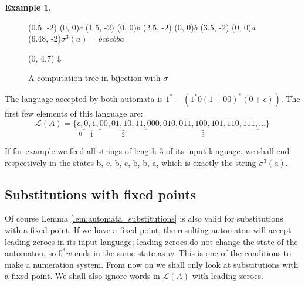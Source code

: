 \documentclass{article}
\theoremstyle{definition}
\newtheorem{example}[theorem]{Example}
\begin{document}
\begin{example}
\begin{figure}[H]
\begin{graph}
  (0.5, -2)  (0, 0){$c$}
  (1.5, -2)  (0, 0){$b$}
  (2.5, -2)  (0, 0){$b$}
  (3.5, -2)  (0, 0){$a$}
  \freetext(6.48, -2){$\sigma^3(a) = bcbcbba$}

   
   

   
   
   
   

   
   
   
   
   
   
   

  \freetext(0, 4.7){$\Downarrow$}
\end{graph}
\caption{A computation tree in bijection with $\sigma$}
\label{fig:automata_tree_substitutions}
\end{figure}
The language accepted by both automata is 
$1^* + (1^* 0 (1 + 00)^* (0 + \epsilon))$. The first few elements of this
language are:
\begin{displaymath}
\mathcal{L}(A) = \{\underbrace{\epsilon,}_0
\underbrace{0, 1,}_1
\underbrace{00, 01, 10, 11,}_ 2
\underbrace{000, 010, 011, 100, 101, 110, 111,}_3 \ldots\}
\end{displaymath}

If for example we feed all strings of length 3 of its input language, we shall
end respectively in the states b, c, b, c, b, b, a, which is exactly the string
$\sigma^3(a)$.
\end{example}

\subsection{Substitutions with fixed points} 
Of course Lemma \ref{lem:automata_substitutions} is also valid for 
substitutions with a fixed point. If we have a fixed point, the resulting 
automaton will accept leading zeroes in its input language; leading zeroes do
not change the state of the automaton, so $0^*w$ ends in the same state as $w$.
This is one of the conditions to make a numeration system. From now on we shall
only look at substitutions with a fixed point. We shall also ignore words in 
$\mathcal{L}(A)$ with leading zeroes.
\end{document}
